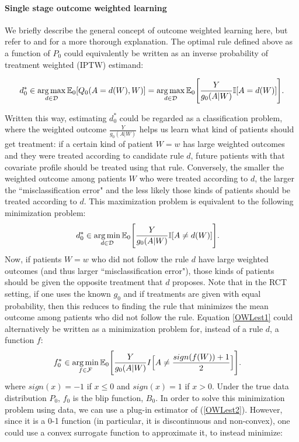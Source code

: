\documentclass[a4paper,12pt]{article}
\DeclareMathOperator*{\argmax}{arg\,max}
\DeclareMathOperator*{\argmin}{arg\,min}
\begin{document}
\paragraph{Single stage outcome weighted learning}
We briefly describe the general concept of outcome weighted learning here, but refer to \citet{zhao2012estimating} and \citet{rubin2012statistical} for a more thorough explanation. The optimal rule defined above as a function of $P_0$ could equivalently be written as an inverse probability of treatment weighted (IPTW) estimand:

\[d_0^* \in \argmax_{d \in \mathcal{D}}  \mathbb{E}_0[Q_0(A=d(W),W)]=  \argmax_{d \in \mathcal{D}} \mathbb{E}_0\Bigg{[}\frac{Y}{g_0(A|W)}\mathbb{I}[A=d(W)]\Bigg{]}.\]

Written this way, estimating $d_0^*$ could be regarded as a classification problem, where the weighted outcome $\frac{Y}{g_0(A|W)}$ helps us learn what kind of patients should get treatment: if a certain kind of patient $W=w$ has large weighted outcomes and they were treated according to candidate rule $d$, future patients with that covariate profile should be treated using that rule. Conversely, the smaller the weighted outcome among patients $W$ who were treated according to $d$, the larger the ``misclassification error" and the less likely those kinds of patients should be treated according to $d$. This maximization problem is equivalent to the following minimization problem:
\begin{align}\label{OWLest1}
d_0^* & \in \argmin_{d \in \mathcal{D}} \mathbb{E}_0\Bigg{[}\frac{Y}{g_0(A|W)}\mathbb{I}[A \neq d(W)]\Bigg{]}.
\end{align}
Now, if patients $W=w$ who did not follow the rule $d$ have large weighted outcomes (and thus larger ``misclassification error"), those kinds of patients should be given the opposite treatment that $d$ proposes. Note that in the RCT setting, if one uses the known $g_0$ and if treatments are given with equal probability, then this reduces to finding the rule that minimizes the mean outcome among patients who did not follow the rule. Equation \ref{OWLest1} could alternatively be written as a minimization problem for, instead of a rule $d$, a function $f$:
\begin{align}\label{OWLest2}
    f_0^*& \in \argmin_{f\in \mathcal{F}}  \mathbb{E}_0\Bigg{[}\frac{Y}{g_0(A|W)}I\Big{[}A \neq \frac{sign(f(W))+1}{2}\Big{]}\Bigg{]}.
\end{align}  
where $sign(x)=-1$ if $x \leq 0$ and $sign(x)=1$ if $x > 0$. Under the true data distribution $P_0$, $f_0$ is the blip function, $B_0$. In order to solve this minimization problem using data, we can use a plug-in estimator of (\ref{OWLest2}). However, since it is a 0-1 function (in particular, it is discontinuous and non-convex), one could use a convex surrogate function to approximate it, to instead minimize:
\end{document}
